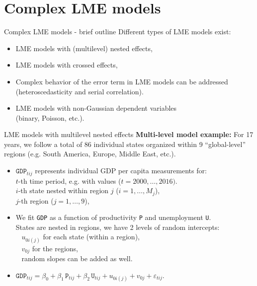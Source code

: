 \documentclass{beamer}
\begin{document}
\section{Complex LME models}
\begin{frame}{Complex LME models - brief outline}
Different types of LME models exist:\\
\bigskip
\begin{itemize}
\item LME models with (multilevel) nested effects,
\medskip
\item LME models with crossed effects,
\medskip
\item Complex behavior of the error term in LME models can be addressed (heteroscedasticity and serial correlation).
\medskip
\item LME models with non-Gaussian dependent variables \\(binary, Poisson, etc.).
\end{itemize}
\end{frame}
\begin{frame}{LME models with multilevel nested effects}
\textbf{Multi-level model example:} For 17 years, we follow a total of 86 individual states organized within 9 ``global-level'' regions (e.g. South America, Europe, Middle East, etc.).
\medskip
\begin{itemize}
\item $\texttt{GDP}_{tij}$ represents individual GDP per capita measurements for:\\
\smallskip
$t$-th time period, e.g. with values ($t= 2000, \dots, 2016)$.\\
$i$-th state nested within region $j$ ($i=1,\dots,M_j$),\\
$j$-th region ($j=1,\dots,9$),\\
\medskip
\item We fit \texttt{GDP} as a function of productivity \texttt{P} and unemployment \texttt{U}.\\
\smallskip
States are nested in regions, we have 2 levels of random intercepts: \\
~ $u_{0i(j)}$ for each state (within a region),\\
~ $v_{0j}$ for the regions,\\
~ random slopes can be added as well.
\bigskip
\item $\texttt{GDP}_{tij} = \beta_0 + \beta_1 \, \texttt{P}_{tij} 
+ \beta_2 \, \texttt{U}_{tij} + u_{0i(j)} + v_{0j}  + \varepsilon_{tij}.$
\end{itemize}
\end{frame}
\end{document}
